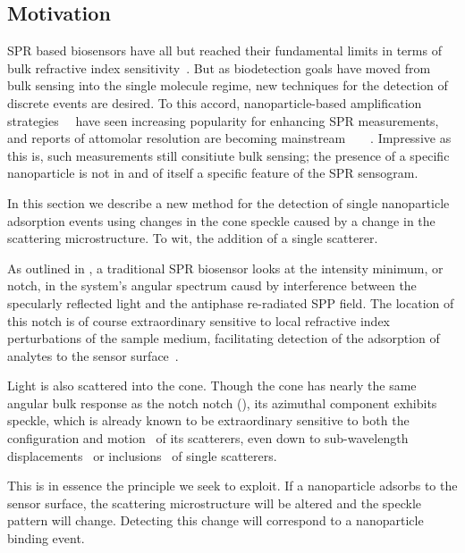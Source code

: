 \subsection{Motivation}
SPR based biosensors have all but reached
their fundamental limits in terms of bulk refractive index
sensitivity~\cite{piliarik2009surface}.  But as biodetection goals have
moved from bulk sensing into the single molecule regime, new techniques for
the detection of discrete events are desired.  To this accord,
nanoparticle-based amplification
strategies~\cite{wang2005nanomaterial}~\cite{jain2007review} have seen
increasing popularity for enhancing SPR measurements, and reports of
attomolar resolution are becoming
mainstream~\cite{fang2006attomole}~\cite{krishnan2011attomolar}~\cite{kwon2012nanoparticle}~\cite{sim2010attomolar}.
Impressive as this is, such measurements still consitiute bulk sensing;
the presence of a specific nanoparticle is not in and of itself a
specific feature of the SPR sensogram.

In this section we describe a new method for the detection of single
nanoparticle adsorption events using changes in the cone speckle caused by
a change in the scattering microstructure.  To wit, the addition of a
single scatterer.

As outlined in , a traditional SPR biosensor looks at
the intensity minimum, or notch, in the system's angular spectrum causd by
interference between the specularly reflected light and the antiphase
re-radiated SPP field.  The location of this notch is of course
extraordinary sensitive to local refractive index perturbations of the
sample medium, facilitating detection of the adsorption of analytes to the
sensor surface~\cite{homola1999surface}.  

Light is also scattered into the cone.  Though the cone has nearly the same
angular bulk response as the notch notch (), its
azimuthal component exhibits speckle, which is already known to be
extraordinary sensitive to both the configuration and
motion~\cite{berkovits1994correlations} of its scatterers, even down to
sub-wavelength displacements~\cite{berkovits1991sensitivity} or
inclusions~\cite{berkovits1990theory} of single scatterers.

This is in essence the principle we seek to exploit.  If a nanoparticle
adsorbs to the sensor surface, the scattering microstructure will be
altered and the speckle pattern will change.  Detecting this change will
correspond to a nanoparticle binding event.

